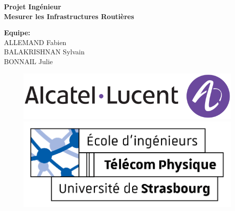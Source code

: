 \documentclass{article}
\begin{document}
\thispagestyle{empty}
\addtocounter{page}{-1}
\begin{center}
    \baselineskip=50pt
    \vspace*{1cm}
    \textbf{{\Huge Projet Ingénieur}}\\
    \vspace*{0.25cm}
    \textbf{{\Huge Mesurer les Infrastructures Routières}}\\
    \vspace*{0.25cm}
    \begin{minipage}[c]{.46\linewidth}
        \centering
        \textbf{Equipe:}\\
        ALLEMAND Fabien\\BALAKRISHNAN Sylvain\\BONNAIL Julie
    \end{minipage}
\end{center}
\vspace*{0.1cm}

\begin{figure}[H]
    \centering
    \centerline{\includegraphics[scale=.66]{../../common/logo_Alcatel_1.png}}
    \vspace*{0.1cm}
    \centerline{\includegraphics[scale=1.25]{../../common/logo_TPS_2.png}}
\end{figure}

\newpage
\renewcommand{\contentsname}{Table des matières}
\tableofcontents

\newpage
{}
\renewcommand{\listfigurename}{Liste des figures}
\listoffigures

\newpage
\vspace*{0.01cm}















\newpage
\vspace*{0.01cm}
\renewcommand{\refname}{Bibliographie}


\end{document}
